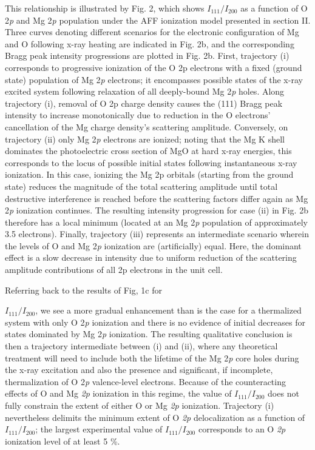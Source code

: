 This relationship is illustrated by Fig. 2, which shows
\(I_{111}/I_{200}\) as a function of O 2\emph{p} and Mg 2\emph{p}
population under the AFF ionization model presented in section II. Three
curves denoting different scenarios for the electronic configuration of
Mg and O following x-ray heating are indicated in Fig. 2b, and the
corresponding Bragg peak intensity progressions are plotted in Fig. 2b.
First, trajectory (i) corresponds to progressive ionization of the O 2p
electrons with a fixed (ground state) population of Mg 2\emph{p}
electrons; it encompasses possible states of the x-ray excited system
following relaxation of all deeply-bound Mg 2\emph{p} holes. Along
trajectory (i), removal of O 2p charge density causes the (111) Bragg
peak intensity to increase monotonically due to reduction in the O
electrons' cancellation of the Mg charge density's scattering amplitude.
Conversely, on trajectory (ii) only Mg 2\emph{p} electrons are ionized;
noting that the Mg K shell dominates the photoelectric cross section of
MgO at hard x-ray energies, this corresponds to the locus of possible
initial states following instantaneous x-ray ionization. In this case,
ionizing the Mg 2p orbitals (starting from the ground state) reduces the
magnitude of the total scattering amplitude until total destructive
interference is reached before the scattering factors differ again as Mg
2\emph{p} ionization continues. The resulting intensity progression for
case (ii) in Fig. 2b therefore has a local minimum (located at an Mg
2\emph{p} population of approximately 3.5 electrons). Finally,
trajectory (iii) represents an intermediate scenario wherein the levels
of O and Mg 2\emph{p} ionization are (artificially) equal. Here, the
dominant effect is a slow decrease in intensity due to uniform reduction
of the scattering amplitude contributions of all 2p electrons in the
unit cell.

Referring back to the results of Fig, 1c
for
\(I_{111}/I_{200}\), we see a more gradual enhancement than is the case
for a thermalized system with only O 2\emph{p} ionization and there is
no evidence of initial decreases for states dominated by Mg 2\emph{p}
ionization. The resulting qualitative conclusion is then a trajectory
intermediate between (i) and (ii), where any theoretical treatment will
need to include both the lifetime of the Mg 2\emph{p} core holes during
the x-ray excitation and also the presence and significant, if
incomplete, thermalization of O 2\emph{p} valence-level electrons.
Because of the counteracting effects of O and Mg \emph{2p} ionization in
this regime, the value of \(I_{111}/I_{200}\) does not fully constrain
the extent of either O or Mg \emph{2p} ionization. Trajectory (i)
nevertheless delimits the minimum extent of O \emph{2p} delocalization
as a function of \(I_{111}/I_{200}\); the largest experimental value of
\(I_{111}/I_{200}\) corresponds to an O \emph{2p} ionization level of at
least 5 \%.

